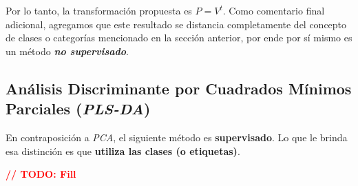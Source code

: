 Por lo tanto, la transformaci\'on propuesta es $P = V^{t}$. Como comentario final adicional, agregamos que este resultado se distancia completamente del concepto de clases o categor\'ias mencionado en la secci\'on anterior, por ende por s\'i mismo es un m\'etodo \textbf{\textit{no supervisado}}.

\subsection{An\'alisis Discriminante por Cuadrados M\'inimos Parciales (\textit{PLS-DA})}\label{intro_plsda}

En contraposici\'on a \textit{PCA}, el siguiente m\'etodo es \textbf{supervisado}. Lo que le brinda esa distinci\'on es que \textbf{utiliza las clases (o etiquetas)}.

\textbf{\textcolor{red}{// TODO: Fill}}
